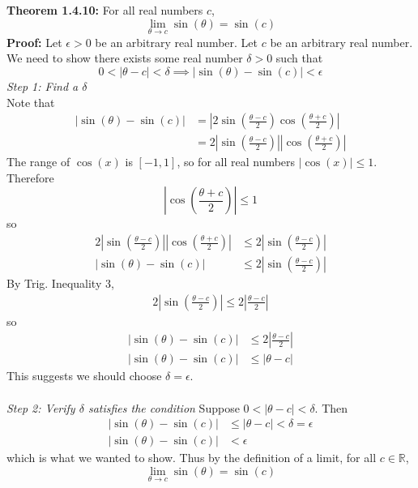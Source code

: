 \documentclass{article}
\begin{document}
	\textbf{Theorem 1.4.10:} For all real numbers $c$,
	$$\lim_{\theta \to c}{\sin{(\theta)}} = \sin{(c)}$$
	\textbf{Proof:}
	Let $\epsilon > 0$ be an arbitrary real number. Let $c$ be an arbitrary real number. We need to show there exists some real number $\delta > 0$ such that
	$$0 < |\theta - c| < \delta \implies |\sin{(\theta)} - \sin{(c)}| < \epsilon$$
	\textit{Step 1: Find a $\delta$} \\
	Note that
	\begin{align*}
		|\sin{(\theta)} - \sin{(c)}| &= \left|2\sin{\left(\frac{\theta - c}{2}\right)}\cos{\left(\frac{\theta + c}{2}\right)}\right| \tag{Sum to Product Formula} \\
									 &= 2\left|\sin{\left(\frac{\theta - c}{2}\right)}\right|\left|\cos{\left(\frac{\theta + c}{2}\right)} \right|
	\end{align*}
	The range of $\cos{(x)}$ is $[-1, 1]$, so for all real numbers $|\cos{(x)}| \leq 1$. Therefore
	$$\left|\cos{\left(\frac{\theta + c}{2}\right)} \right| \leq 1$$
	so
	\begin{align*}
		2\left|\sin{\left(\frac{\theta - c}{2}\right)}\right|\left|\cos{\left(\frac{\theta + c}{2}\right)} \right| &\leq 2\left|\sin{\left(\frac{\theta - c}{2}\right)}\right| \\
		|\sin{(\theta)} - \sin{(c)}| &\leq 2\left|\sin{\left(\frac{\theta - c}{2}\right)}\right|
	\end{align*}
	By Trig. Inequality 3,
	\begin{align*}
		2\left|\sin{\left(\frac{\theta - c}{2}\right)}\right| \leq 2\left|\frac{\theta - c}{2}\right|
	\end{align*}
	so
	\begin{align*}
		|\sin{(\theta)} - \sin{(c)}| &\leq 2\left|\frac{\theta - c}{2}\right| \\
		|\sin{(\theta)} - \sin{(c)}| &\leq |\theta - c|
	\end{align*}
	This suggests we should choose $\delta = \epsilon$. \\\\
	\textit{Step 2: Verify $\delta$ satisfies the condition}
	Suppose $0 < |\theta - c| < \delta$. Then
	\begin{align*}
		|\sin{(\theta)} - \sin{(c)}| &\leq |\theta - c| < \delta = \epsilon \\
		|\sin{(\theta)} - \sin{(c)}| &< \epsilon
	\end{align*}
	which is what we wanted to show. Thus by the definition of a limit, for all $c \in \mathbb{R}$,
	$$\lim_{\theta \to c}{\sin{(\theta)}} = \sin{(c)}$$
\end{document}
